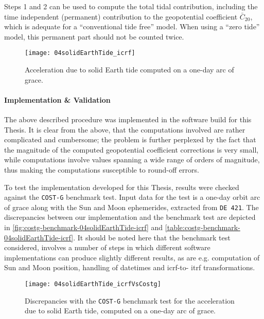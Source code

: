 Steps 1 and 2 can be used to compute the total tidal contribution, including 
the time independent (permanent) contribution to the geopotential coefficient 
$\bar{C}_{20}$, which is adequate for a ``conventional tide free'' model. 
When using a ``zero tide'' model, this permanent part should not be counted 
twice.

\begin{figure}
  \centering
  \texttt{[image: 04solidEarthTide\_icrf]}
  \caption{Acceleration due to solid Earth tide computed on a one-day arc of \gls{grace}.}
  \label{fig:04solidEarthTide-icrf}
\end{figure}

\paragraph{Implementation \& Validation}\label{par:solid-earth-acceleration-implementation}
The above described procedure was implemented in the software build for this Thesis. 
It is clear from the above, that the computations involved are rather complicated and 
cumbersome; the problem is further perplexed by the fact that the magnitude of the 
computed geopotential coefficient corrections is very small, while computations 
involve values spanning a wide range of orders of magnitude, thus making the computations 
susceptible to round-off errors.

To test the implementation developed for this Thesis, results were checked against the \texttt{COST-G} 
benchmark test. Input data for the test is a one-day orbit arc of \gls{grace} 
along with the Sun and Moon ephemerides, extracted from \texttt{DE 421}. 
The discrepancies between our implementation and the benchmark test are depicted in 
\autoref{fig:costg-benchmark-04solidEarthTide-icrf} and \autoref{table:costg-benchmark-04solidEarthTide-icrf}. 
It should be noted here that the benchmark test considered, involves a number of steps in 
which different software implementations can produce slightly different results, 
as are e.g. computation of Sun and Moon position, handling of datetimes and \gls{icrf}-to-
\gls{itrf} transformations.

\begin{figure}
  \centering
  \texttt{[image: 04solidEarthTide\_icrfVsCostg]}
  \caption{Discrepancies with the \texttt{COST-G} benchmark test for the acceleration 
    due to solid Earth tide, computed on a one-day arc of \gls{grace}.}
  \label{fig:costg-benchmark-04solidEarthTide-icrf}
\end{figure}

